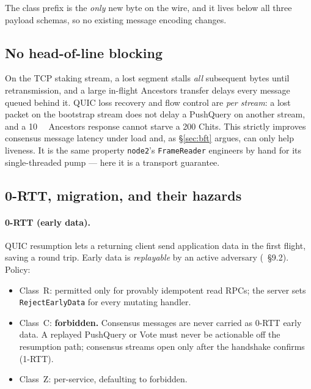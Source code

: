 \documentclass[11pt,a4paper]{article}
\newcommand{\msg}[1]{\textsf{#1}}
\newcommand{\code}[1]{\texttt{#1}}
\begin{document}
The class prefix is the \emph{only} new byte on the wire, and it lives
below all three payload schemas, so no existing message encoding changes.

\subsection{No head-of-line blocking}\label{sec:nohol}

On the TCP staking stream, a lost segment stalls \emph{all} subsequent
bytes until retransmission, and a large in-flight \msg{Ancestors}
transfer delays every message queued behind it. QUIC loss recovery and
flow control are \emph{per stream}: a lost packet on the bootstrap
stream does not delay a \msg{PushQuery} on another stream, and a
\SI{10}{\mega\byte} \msg{Ancestors} response cannot starve a
\SI{200}{\byte} \msg{Chits}. This strictly improves consensus message
latency under load and, as \S\ref{sec:bft} argues, can only help
liveness. It is the same property \code{node2}'s \code{FrameReader}
engineers by hand for its single-threaded pump --- here it is a
transport guarantee.

\subsection{0-RTT, migration, and their hazards}\label{sec:0rtt}

\paragraph{0-RTT (early data).} QUIC resumption lets a returning client
send application data in the first flight, saving a round trip. Early
data is \emph{replayable} by an active adversary
(\cite{rfc9001}~\S9.2). Policy:

\begin{itemize}[nosep]
  \item Class~R: permitted only for provably idempotent read RPCs; the
        server sets \code{RejectEarlyData} for every mutating handler.
  \item Class~C: \textbf{forbidden.} Consensus messages are never carried
        as 0-RTT early data. A replayed \msg{PushQuery} or \msg{Vote}
        must never be actionable off the resumption path; consensus
        streams open only after the handshake confirms (1-RTT).
  \item Class~Z: per-service, defaulting to forbidden.
\end{itemize}
\end{document}
